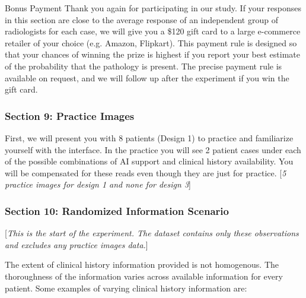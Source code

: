 Bonus Payment Thank you again for participating in our study. If your
responses in this section are close to the average response of an
independent group of radiologists for each case, we will give you
a \$120 gift card to a large e-commerce retailer of your choice (e.g.
Amazon, Flipkart). This payment rule is designed so that your chances
of winning the prize is highest if you report your best estimate of
the probability that the pathology is present. The precise payment
rule is available on request, and we will follow up after the experiment
if you win the gift card.

\subsubsection*{Section 9: Practice Images}

First, we will present you with 8 patients (Design 1) to practice
and familiarize yourself with the interface. In the practice you will
see 2 patient cases under each of the possible combinations of AI
support and clinical history availability. You will be compensated
for these reads even though they are just for practice. {[}\textit{5
practice images for design 1 and none for design 3}{]}

\subsubsection*{Section 10: Randomized Information Scenario }

{[}\textit{This is the start of the experiment. The dataset contains
only these observations and excludes any practice images data.}{]}

The extent of clinical history information provided is not homogenous.
The thoroughness of the information varies across available information
for every patient. Some examples of varying clinical history information
are: 


